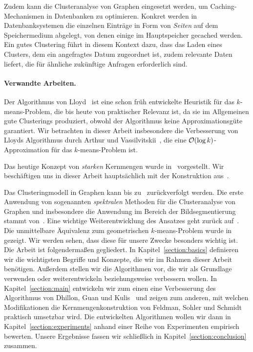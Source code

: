 Zudem kann die Clusteranalyse von Graphen eingesetzt werden, um Caching-Mechanismen in Datenbanken zu optimieren.
Konkret werden in Datenbanksystemen die einzelnen Einträge in Form von \emph{Seiten} auf dem Speichermedium abgelegt,
von denen einige im Hauptspeicher gecached werden. Ein gutes Clustering führt in diesem Kontext dazu, dass das Laden eines
Clusters, dem ein angefragtes Datum zugeordnet ist, zudem relevante Daten liefert, die für ähnliche zukünftige Anfragen
erforderlich sind.

\paragraph{Verwandte Arbeiten.} Der Algorithmus von Lloyd~\cite{Lloyd82} ist eine schon früh entwickelte Heuristik für das
$k$-means-Problem, die bis heute von praktischer Relevanz ist, da sie im Allgemeinen gute Clusterings produziert, obwohl
der Algorithmus keine Approximationsgüte garantiert. Wir betrachten in dieser Arbeit insbesondere die Verbesserung von
Lloyds Algorithmus durch Arthur und Vassilvitskii~\citep{ArthurV07}, die eine $\mathcal{O}(\log k)$-Approximation für das
$k$-means-Problem ist.

Das heutige Konzept von \emph{starken} Kernmengen wurde in~\cite{HarPeledM04} vorgestellt. Wir beschäftigen uns in dieser Arbeit
hauptsächlich mit der Konstruktion aus~\cite{FeldmanSS13,Schmidt14}.

Das Clusteringmodell in Graphen kann bis zu~\cite{KernighanL70} zurückverfolgt werden. Die erste Anwendung von sogenannten
\emph{spektralen} Methoden für die Clusteranalyse von Graphen und insbesondere die Anwendung im Bereich der Bildsegmentierung
stammt von~\cite{ShiM00}. Eine wichtige Weiterentwicklung des Ansatzes geht zurück auf~\cite{NgJW01}. Die unmittelbare
Äquivalenz zum geometrischen $k$-means-Problem wurde in~\cite{DhillonGK04,DhillonGK07} gezeigt. Wir werden sehen, dass diese
für unsere Zwecke besonders wichtig ist.
\absatz
Die Arbeit ist folgendermaßen gegliedert. In Kapitel~\ref{section:basics} definieren wir die wichtigsten Begriffe und
Konzepte, die wir im Rahmen dieser Arbeit benötigen. Außerdem stellen wir die Algorithmen vor, die wir als Grundlage verwenden
oder weiterentwickeln beziehungsweise verbessern wollen. In Kapitel~\ref{section:main} entwickeln wir zum einen eine
Verbesserung des Algorithmus von Dhillon, Guan und Kulis~\cite{DhillonGK04,DhillonGK07} und zeigen zum anderen, mit welchen
Modifikationen die Kernmengenkonstruktion von Feldman, Sohler und Schmidt~\cite{FeldmanSS13,Schmidt14} praktisch umsetzbar wird.
Die entwickelten Algorithmen wollen wir dann in Kapitel~\ref{section:experiments} anhand einer Reihe von Experimenten empirisch
bewerten. Unsere Ergebnisse fassen wir schließlich in Kapitel~\ref{section:conclusion} zusammen.